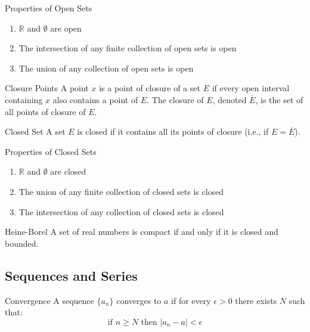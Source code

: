 \begin{theorembox}{Properties of Open Sets}
\begin{enumerate}[label=(\roman*)]
\item $\mathbb{R}$ and $\emptyset$ are open
\item The intersection of any finite collection of open sets is open
\item The union of any collection of open sets is open
\end{enumerate}
\end{theorembox}

\begin{definitionbox}{Closure Points}
A point $x$ is a point of closure of a set $E$ if every open interval containing $x$ also contains a point of $E$.
The closure of $E$, denoted $\overline{E}$, is the set of all points of closure of $E$.
\end{definitionbox}

\begin{definitionbox}{Closed Set}
A set $E$ is closed if it contains all its points of closure (i.e., if $E = \overline{E}$).
\end{definitionbox}

\begin{theorembox}{Properties of Closed Sets}
\begin{enumerate}[label=(\roman*)]
\item $\mathbb{R}$ and $\emptyset$ are closed
\item The union of any finite collection of closed sets is closed
\item The intersection of any collection of closed sets is closed
\end{enumerate}
\end{theorembox}

\begin{theorembox}{Heine-Borel}
A set of real numbers is compact if and only if it is closed and bounded.
\end{theorembox}

\subsection{Sequences and Series}

\begin{definitionbox}{Convergence}
A sequence $\{a_n\}$ converges to $a$ if for every $\epsilon > 0$ there exists $N$ such that:
\[ \text{if } n \geq N \text{ then } |a_n - a| < \epsilon \]
\end{definitionbox}


